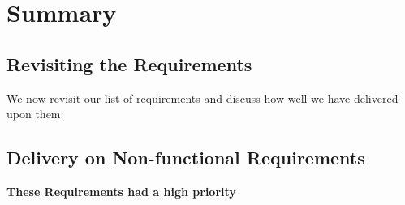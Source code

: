 
\section{Summary} \label{implementsummary}

\subsection{Revisiting the Requirements} \label{requirementsrevisited}

We now revisit our list of requirements and discuss how well we have delivered upon them:

\subsection{Delivery on Non-functional Requirements}
\textbf{These Requirements had a high priority}

